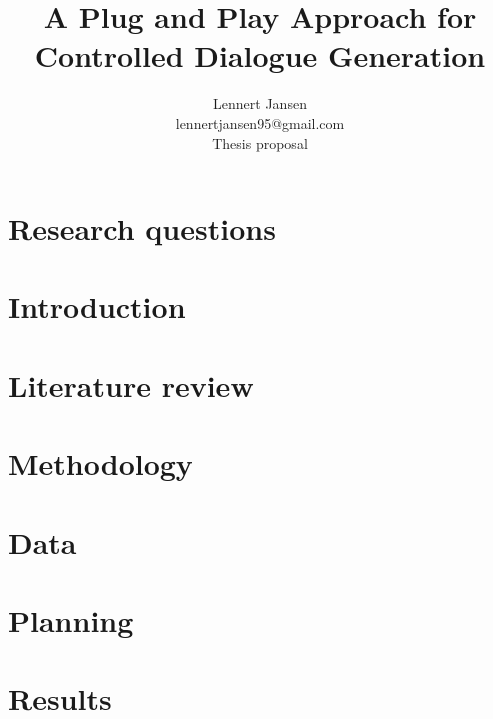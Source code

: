 \documentclass{article}
\title{A Plug and Play Approach for Controlled Dialogue Generation}
\author{%
  Lennert Jansen\\
  lennertjansen95@gmail.com \\
  Thesis proposal
}
\begin{document}
 
\maketitle

\section{Research questions}


\section{Introduction}


\section{Literature review}


\section{Methodology}


\section{Data}



\section{Planning}


\section{Results}


\newpage



\newpage
\end{document}
